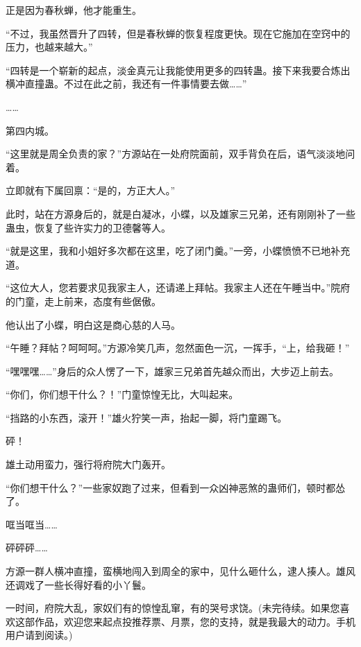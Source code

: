 \begin{this_body}
正是因为春秋蝉，他才能重生。

“不过，我虽然晋升了四转，但是春秋蝉的恢复程度更快。现在它施加在空窍中的压力，也越来越大。”

“四转是一个崭新的起点，淡金真元让我能使用更多的四转蛊。接下来我要合炼出横冲直撞蛊。不过在此之前，我还有一件事情要去做……”

……

第四内城。

“这里就是周全负责的家？”方源站在一处府院面前，双手背负在后，语气淡淡地问着。

立即就有下属回禀：“是的，方正大人。”

此时，站在方源身后的，就是白凝冰，小蝶，以及雄家三兄弟，还有刚刚补了一些蛊虫，恢复了些许实力的卫德馨等人。

“就是这里，我和小姐好多次都在这里，吃了闭门羹。”一旁，小蝶愤愤不已地补充道。

“这位大人，您若要求见我家主人，还请递上拜帖。我家主人还在午睡当中。”院府的门童，走上前来，态度有些倨傲。

他认出了小蝶，明白这是商心慈的人马。

“午睡？拜帖？呵呵呵。”方源冷笑几声，忽然面色一沉，一挥手，“上，给我砸！”

“嘿嘿嘿……”身后的众人愣了一下，雄家三兄弟首先越众而出，大步迈上前去。

“你们，你们想干什么？！”门童惊惶无比，大叫起来。

“挡路的小东西，滚开！”雄火狞笑一声，抬起一脚，将门童踢飞。

砰！

雄土动用蛮力，强行将府院大门轰开。

“你们想干什么？”一些家奴跑了过来，但看到一众凶神恶煞的蛊师们，顿时都怂了。

哐当哐当……

砰砰砰……

方源一群人横冲直撞，蛮横地闯入到周全的家中，见什么砸什么，逮人揍人。雄风还调戏了一些长得好看的小丫鬟。

一时间，府院大乱，家奴们有的惊惶乱窜，有的哭号求饶。(未完待续。如果您喜欢这部作品，欢迎您来起点投推荐票、月票，您的支持，就是我最大的动力。手机用户请到阅读。)

\end{this_body}

